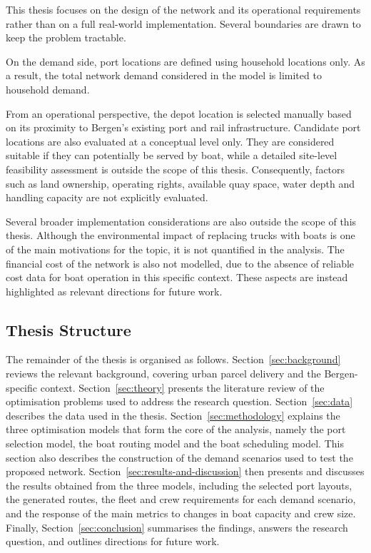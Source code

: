 \documentclass[12pt]{article}
\begin{document}
This thesis focuses on the design of the network and its operational requirements rather than on a full real-world implementation. Several boundaries are drawn to keep the problem tractable.

On the demand side, port locations are defined using household locations only. As a result, the total network demand considered in the model is limited to household demand.

From an operational perspective, the depot location is selected manually based on its proximity to Bergen's existing port and rail infrastructure. Candidate port locations are also evaluated at a conceptual level only. They are considered suitable if they can potentially be served by boat, while a detailed site-level feasibility assessment is outside the scope of this thesis. Consequently, factors such as land ownership, operating rights, available quay space, water depth and handling capacity are not explicitly evaluated.

Several broader implementation considerations are also outside the scope of this thesis. Although the environmental impact of replacing trucks with boats is one of the main motivations for the topic, it is not quantified in the analysis. The financial cost of the network is also not modelled, due to the absence of reliable cost data for boat operation in this specific context. These aspects are instead highlighted as relevant directions for future work.

\subsection{Thesis Structure}
\label{subsec:thesis-structure}

The remainder of the thesis is organised as follows. Section~\ref{sec:background} reviews the relevant background, covering urban parcel delivery and the Bergen-specific context. Section~\ref{sec:theory} presents the literature review of the optimisation problems used to address the research question. Section~\ref{sec:data} describes the data used in the thesis. Section~\ref{sec:methodology} explains the three optimisation models that form the core of the analysis, namely the port selection model, the boat routing model and the boat scheduling model. This section also describes the construction of the demand scenarios used to test the proposed network. Section~\ref{sec:results-and-discussion} then presents and discusses the results obtained from the three models, including the selected port layouts, the generated routes, the fleet and crew requirements for each demand scenario, and the response of the main metrics to changes in boat capacity and crew size. Finally, Section~\ref{sec:conclusion} summarises the findings, answers the research question, and outlines directions for future work.
\end{document}
